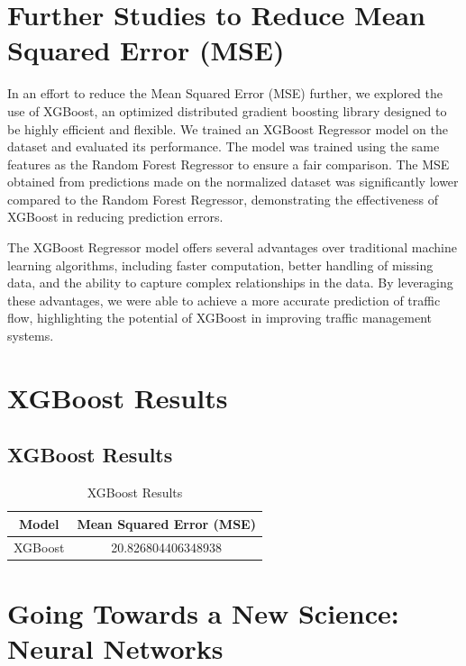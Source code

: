 \documentclass{IEEEtran}
\begin{document}
\section{Further Studies to Reduce Mean Squared Error (MSE)}

In an effort to reduce the Mean Squared Error (MSE) further, we explored the use of XGBoost, an optimized distributed gradient boosting library designed to be highly efficient and flexible. We trained an XGBoost Regressor model on the dataset and evaluated its performance. The model was trained using the same features as the Random Forest Regressor to ensure a fair comparison. The MSE obtained from predictions made on the normalized dataset was significantly lower compared to the Random Forest Regressor, demonstrating the effectiveness of XGBoost in reducing prediction errors.

The XGBoost Regressor model offers several advantages over traditional machine learning algorithms, including faster computation, better handling of missing data, and the ability to capture complex relationships in the data. By leveraging these advantages, we were able to achieve a more accurate prediction of traffic flow, highlighting the potential of XGBoost in improving traffic management systems.

\section{XGBoost Results}

\subsection{XGBoost Results}

\begin{table}[htbp]
\caption{XGBoost Results}
\begin{center}
\begin{tabular}{|c|c|}
\hline
\textbf{Model} & \textbf{Mean Squared Error (MSE)} \\
\hline
XGBoost & 20.826804406348938 \\
\hline
\end{tabular}
\end{center}
\label{default}
\end{table}%

\section{Going Towards a New Science: Neural Networks}
\end{document}
